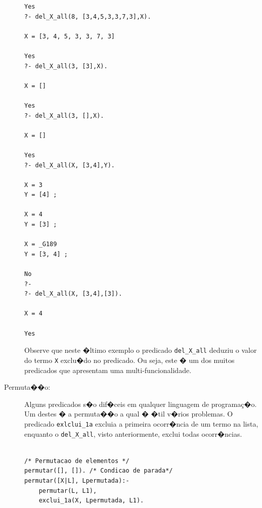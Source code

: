 \documentclass[final,a4paper]{article}
\begin{document}
\begin{description}
\begin{lstlisting}
Yes
?- del_X_all(8, [3,4,5,3,3,7,3],X).

X = [3, 4, 5, 3, 3, 7, 3] 

Yes
?- del_X_all(3, [3],X).

X = [] 

Yes
?- del_X_all(3, [],X).

X = [] 

Yes
?- del_X_all(X, [3,4],Y).

X = 3
Y = [4] ;

X = 4
Y = [3] ;

X = _G189
Y = [3, 4] ;

No
?- 
?- del_X_all(X, [3,4],[3]).

X = 4 

Yes

\end{lstlisting}

Observe que neste �ltimo exemplo  o predicado 
{\tt del\_X\_all} deduziu o valor do termo {\tt X} 
exclu�do no predicado. Ou seja, este � um
dos muitos predicados que apresentam uma
multi-funcionalidade.

\newpage
\item [Permuta��o:] Alguns predicados s�o dif�ceis em qualquer
linguagem de programa\c{c}�o. Um destes � a permuta��o
a qual � �til v�rios problemas. O predicado {\tt exlclui\_1a} excluia
a primeira ocorr�ncia de um termo na lista, enquanto o  {\tt del\_X\_all}, visto anteriormente, exclui todas ocorr�ncias.



\begin{lstlisting}

/* Permutacao de elementos */
permutar([], []). /* Condicao de parada*/
permutar([X|L], Lpermutada):-
  	permutar(L, L1), 
	exclui_1a(X, Lpermutada, L1).


\end{lstlisting}
\end{description}
\end{document}

